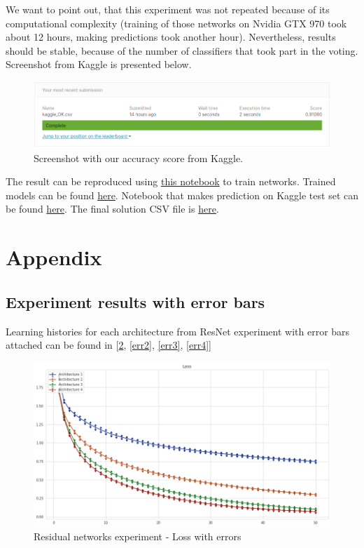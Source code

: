 \documentclass{article}
\begin{document}
We want to point out, that this experiment was not repeated because of its computational complexity (training of those networks on Nvidia GTX 970 took about 12 hours, making predictions took another hour). Nevertheless, results should be stable, because of the number of classifiers that took part in the voting. Screenshot from Kaggle is presented below. 

\begin{figure}[!h]
\centering
  \includegraphics[width=0.6\linewidth]{kaggle.png}  
\caption{Screenshot with our accuracy score from Kaggle.}
\label{kaggle}
\end{figure}


The result can be reproduced using \href{https://github.com/krzysztofspalinski/deep-learning-methods-project-2/blob/master/notebooks/eksperyment-plain-cnn.ipynb}{this notebook} to train networks. Trained models can be found \href{https://drive.google.com/drive/folders/1nLcQi99gMlS13X3SBfsNG3rxye-Ux5ZH?usp=sharing}{here}. Notebook that makes prediction on Kaggle test set can be found \href{https://github.com/krzysztofspalinski/deep-learning-methods-project-2/blob/master/notebooks/kaggle_submission.ipynb}{here}. The final solution CSV file is \href{https://github.com/krzysztofspalinski/deep-learning-methods-project-2/blob/master/results/kaggle_OK.csv}{here}.


\vspace{20em}
\printbibliography


\section{Appendix}
\subsection{Experiment results with error bars}

Learning histories for each architecture from ResNet experiment with error bars attached can be found in [\ref{err1}, \ref{err2}, \ref{err3}, \ref{err4}]

\begin{figure}[!h]
  \includegraphics[width=1\linewidth]{resnet_experimentloss_errorbars.png}  
\caption{Residual networks experiment - Loss with errors}
\label{err1}
\end{figure}
\end{document}
